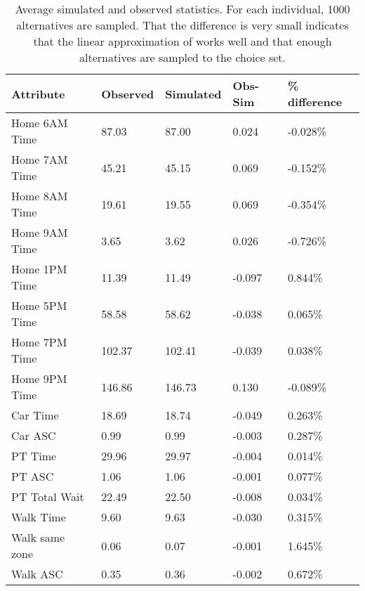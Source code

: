 \begin{table}\caption{Average simulated and observed statistics. For each individual, 1000 alternatives are sampled. That the difference is very small indicates that the linear approximation of \aeutil works well and that enough alternatives are sampled to the choice set. \label{tab:check}}
	\centering
	\begin{tabular}{lllll}
		\toprule
		\noalign{\smallskip}
		 Attribute & Observed  & Simulated & Obs-Sim & \% difference  \\
		\midrule
	                  Home 6AM Time &      87.03 &      87.00 &      0.024 &     -0.028\% \\ 
	                  Home 7AM Time &      45.21 &      45.15 &      0.069 &     -0.152\% \\ 
	                  Home 8AM Time &      19.61 &      19.55 &      0.069 &     -0.354\% \\ 
	                  Home 9AM Time &       3.65 &       3.62 &      0.026 &     -0.726\% \\ 
	                  Home 1PM Time &      11.39 &      11.49 &     -0.097 &      0.844\% \\ 
	                  Home 5PM Time &      58.58 &      58.62 &     -0.038 &      0.065\% \\ 
	                  Home 7PM Time &     102.37 &     102.41 &     -0.039 &      0.038\% \\ 
	                  Home 9PM Time &     146.86 &     146.73 &      0.130 &     -0.089\% \\ 
	                  Car Time &      18.69 &      18.74 &     -0.049 &      0.263\% \\ 
	                  Car ASC &       0.99 &       0.99 &     -0.003 &      0.287\% \\ 
	                  PT Time &      29.96 &      29.97 &     -0.004 &      0.014\% \\ 
	                  PT ASC &       1.06 &       1.06 &     -0.001 &      0.077\% \\ 
	                  PT Total Wait &      22.49 &      22.50 &     -0.008 &      0.034\% \\ 
	                  Walk Time &       9.60 &       9.63 &     -0.030 &      0.315\% \\ 
	                  Walk same zone &       0.06 &       0.07 &     -0.001 &      1.645\% \\ 
	                  Walk ASC &       0.35 &       0.36 &     -0.002 &      0.672\% \\ 

\end{tabular}
\end{table}
